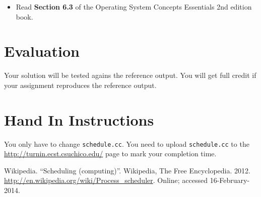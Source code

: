 \documentclass[11pt]{article}
\begin{document}
\begin{itemize}
\item Read {\bf Section 6.3} of the Operating System Concepts Essentials 2nd edition
book. 


\end{itemize}

\section*{Evaluation}

Your solution will be tested agains the reference output. You will get full credit if your assignment reproduces the reference output. 

\section*{Hand In Instructions}

You only have to change {\tt schedule.cc}.  You need to upload
 {\tt schedule.cc} to the \url{http://turnin.ecst.csuchico.edu/} page to mark your completion
time.



\begin{thebibliography}{3}

 Wikipedia.
  \newblock ``Scheduling (computing)''.
  \newblock Wikipedia, The Free Encyclopedia. 2012.
  \newblock
  \url{http://en.wikipedia.org/wiki/Process_scheduler}.
  \newblock Online; accessed 16-February-2014.

\end{thebibliography}
\end{document}
